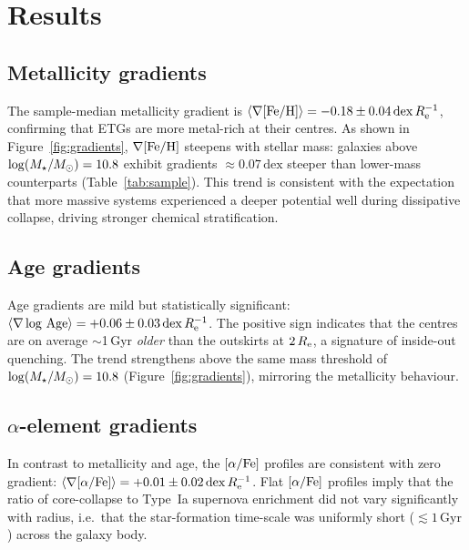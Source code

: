 \section{Results}
\label{sec:results}

\subsection{Metallicity gradients}

The sample-median metallicity gradient is
$\langle\nabla[\mathrm{Fe/H}]\rangle = -0.18 \pm 0.04\,\mathrm{dex}\,R_{\mathrm{e}}^{-1}$,
confirming that ETGs are more metal-rich at their centres.
As shown in Figure~\ref{fig:gradients}, $\nabla[\mathrm{Fe/H}]$ steepens with
stellar mass: galaxies above $\log(M_{\star}/M_{\odot}) = 10.8$ exhibit
gradients $\approx 0.07\,\mathrm{dex}$ steeper than lower-mass
counterparts (Table~\ref{tab:sample}).
This trend is consistent with the expectation that more massive
systems experienced a deeper potential well during dissipative
collapse, driving stronger chemical stratification.

\subsection{Age gradients}

Age gradients are mild but statistically significant:
$\langle\nabla\log\,\mathrm{Age}\rangle = +0.06 \pm 0.03\,\mathrm{dex}\,R_{\mathrm{e}}^{-1}$.
The positive sign indicates that the centres are on average
$\sim$1\,Gyr \emph{older} than the outskirts at $2\,R_{\mathrm{e}}$,
a signature of inside-out quenching.
The trend strengthens above the same mass threshold of
$\log(M_{\star}/M_{\odot}) = 10.8$ (Figure~\ref{fig:gradients}),
mirroring the metallicity behaviour.

\subsection{$\alpha$-element gradients}

In contrast to metallicity and age, the $[\alpha/\mathrm{Fe}]$ profiles are
consistent with zero gradient:
$\langle\nabla[\alpha/\mathrm{Fe}]\rangle = +0.01 \pm 0.02\,\mathrm{dex}\,R_{\mathrm{e}}^{-1}$.
Flat $[\alpha/\mathrm{Fe}]$ profiles imply that the ratio of core-collapse to
Type~Ia supernova enrichment did not vary significantly with radius,
i.e.\ that the star-formation time-scale was uniformly short
($\lesssim 1\,\mathrm{Gyr}$) across the galaxy body.


